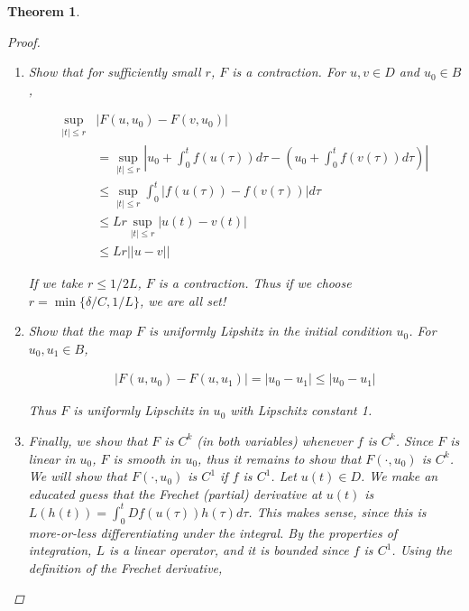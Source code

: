 \documentclass{article}
\newtheorem{theorem}{Theorem}[section]
\begin{document}
\begin{theorem}
\begin{proof}
\begin{enumerate}
\begin{align*}
\sup_{|t| \leq r} |F(u, u_0) - \tilde{u}| &= 
\sup_{|t| \leq r} \left|u_0 + \int_0^t f(u(\tau)) d\tau - \tilde{u}\right| \\
&\leq |u_0 - \tilde{u}| + \int_0^r |f(u(\tau))| d \tau \\
\end{align*}

Since $u \in D$, $u(\tau) \in B_{2 \delta}(\tilde{u})$ for all $\tau \in [-r, r]$, thus $|f(u(\tau)| \leq C$ for all $\tau \in [-r, r]$. Thus we have

\begin{align*}
\sup_{|t| \leq r} |F(u, u_0) - \tilde{u}|
&< \delta + C r \delta \\
\end{align*}

If we take $r \leq \delta/C$, we have $\sup_{|t| \leq r} |F(u, u_0) - \tilde{u}| < 2 \delta$, which is what we want.

\item Show that for sufficiently small $r$, $F$ is a contraction. For $u, v \in D$ and $u_0 \in B$, 

\begin{align*}
\sup_{|t|\leq r}&|F(u, u_0) - F(v, u_0)| \\
&=\sup_{|t|\leq r} \left| u_0 + \int_0^t f(u(\tau)) d \tau - \left(u_0 + \int_0^t f(v(\tau)) d \tau \right) \right| \\
&\leq \sup_{|t|\leq r} \int_0^t | f(u(\tau)) - f(v(\tau))| d \tau \\
&\leq L r \sup_{|t|\leq r} |u(t) - v(t)| \\
&\leq L r ||u - v||
\end{align*}

If we take $r \leq 1/2L$, $F$ is a contraction. Thus if we choose $r = \min\{ \delta/C, 1/L\}$, we are all set!

\item Show that the map $F$ is uniformly Lipshitz in the initial condition $u_0$. For $u_0, u_1 \in B$,

\begin{align*}
|F(u, u_0) - F(u, u_1)| = |u_0 - u_1| \leq |u_0 - u_1|
\end{align*} 

Thus $F$ is uniformly Lipschitz in $u_0$ with Lipschitz constant 1.

\item Finally, we show that $F$ is $C^k$ (in both variables) whenever $f$ is $C^k$. Since $F$ is linear in $u_0$, $F$ is smooth in $u_0$, thus it remains to show that $F(\cdot, u_0)$ is $C^k$.\\ 
We will show that $F(\cdot, u_0)$ is $C^1$ if $f$ is $C^1$. Let $u(t) \in D$. We make an educated guess that the Frechet (partial) derivative at $u(t)$ is $L(h(t)) = \int_0^t Df(u(\tau)) h(\tau) d \tau$. This makes sense, since this is more-or-less differentiating under the integral. By the properties of integration, $L$ is a linear operator, and it is bounded since $f$ is $C^1$. Using the definition of the Frechet derivative,


\end{enumerate}
\end{proof}
\end{theorem}
\end{document}
